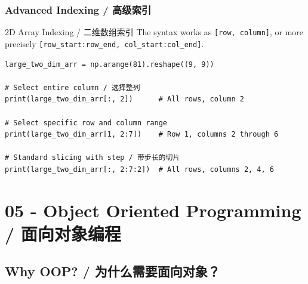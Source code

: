 \documentclass[11pt,a4paper]{report}
\let\oldtexttt\texttt
\renewcommand{\texttt}[1]{\textcolor{mainblue}{\oldtexttt{#1}}}
\begin{document}
\subsection{Advanced Indexing / 高级索引}

\begin{examplebox}{2D Array Indexing / 二维数组索引}
    The syntax works as \texttt{[row, column]}, or more precisely \texttt{[row\_start:row\_end, col\_start:col\_end]}.
\begin{lstlisting}
large_two_dim_arr = np.arange(81).reshape((9, 9))

# Select entire column / 选择整列
print(large_two_dim_arr[:, 2])      # All rows, column 2

# Select specific row and column range
print(large_two_dim_arr[1, 2:7])    # Row 1, columns 2 through 6

# Standard slicing with step / 带步长的切片
print(large_two_dim_arr[:, 2:7:2])  # All rows, columns 2, 4, 6
\end{lstlisting}
\end{examplebox}



\chapter{05 - Object Oriented Programming / 面向对象编程}



\section{Why OOP? / 为什么需要面向对象？}
\end{document}
